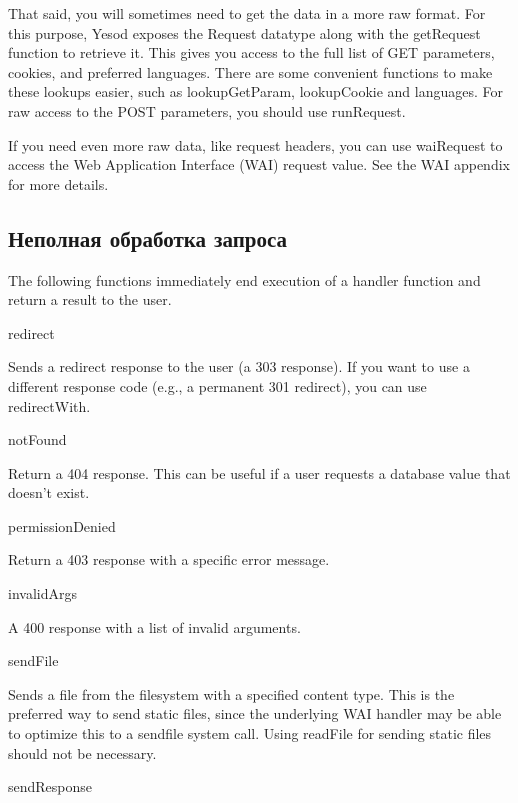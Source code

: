 That said, you will sometimes need to get the data in a more raw
format. For this purpose, Yesod exposes the Request datatype along
with the getRequest function to retrieve it. This gives you access to
the full list of GET parameters, cookies, and preferred
languages. There are some convenient functions to make these lookups
easier, such as lookupGetParam, lookupCookie and languages. For raw
access to the POST parameters, you should use runRequest.

If you need even more raw data, like request headers, you can use
waiRequest to access the Web Application Interface (WAI) request
value. See the WAI appendix for more details.

\subsection{Неполная обработка запроса}

The following functions immediately end execution of a handler
function and return a result to the user.

redirect

Sends a redirect response to the user (a 303 response). If you want to
use a different response code (e.g., a permanent 301 redirect), you
can use redirectWith.


notFound

Return a 404 response. This can be useful if a user requests a
database value that doesn't exist.

permissionDenied

Return a 403 response with a specific error message.

invalidArgs

A 400 response with a list of invalid arguments.

sendFile

Sends a file from the filesystem with a specified content type. This
is the preferred way to send static files, since the underlying WAI
handler may be able to optimize this to a sendfile system call. Using
readFile for sending static files should not be necessary.

sendResponse

